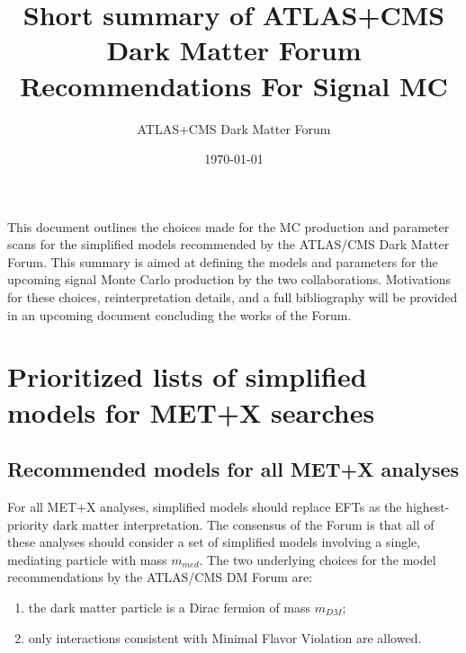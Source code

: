 \documentclass[a4,debug,notitlepage,nobib]{tufte-handout}
\title{Short summary of ATLAS+CMS Dark Matter Forum Recommendations For Signal MC}
\author{ATLAS+CMS Dark Matter Forum}
\date{\today}
\newcommand{\blankpage}{\newpage\hbox{}\thispagestyle{empty}\newpage}
\newcommand{\mdm}{\ensuremath{m_{DM}}\xspace}
\newcommand{\mmed}{\ensuremath{m_{med}}\xspace}
\begin{document}
\setcounter{secnumdepth}{3} %

\maketitle


This document outlines the choices made for the MC production and parameter scans
for the simplified models recommended by the ATLAS/CMS Dark Matter Forum. 
This summary is aimed at defining the models and parameters
for the upcoming signal Monte Carlo production by the two collaborations. 
Motivations for these choices, reinterpretation details, and a full bibliography 
will be provided in an upcoming document concluding the works of the Forum.

\section{Prioritized lists of simplified models for MET+X searches}

\subsection{Recommended models for all MET+X analyses}
\label{sec:RecommendedModelsAllAnalyses}

For all MET+X analyses, simplified models should replace EFTs as the
highest-priority dark matter interpretation. The consensus of the
Forum is that all of these analyses should consider a set of simplified models involving 
a single, mediating particle with mass \mmed. 
The two underlying choices for the model recommendations by the ATLAS/CMS DM Forum are:
\begin{enumerate}
 \item the dark matter particle is a Dirac fermion of mass \mdm;
 \item only interactions consistent with Minimal Flavor Violation are allowed.
\end{enumerate}
\end{document}
